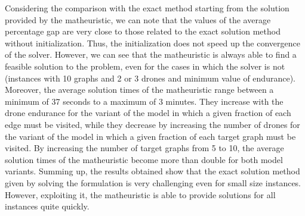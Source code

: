 \documentclass[10pt,a4paper]{elsarticle}
\newcommand{\EN}[1]{{\color{black}#1}}
\begin{document}
			Considering the comparison with the exact method starting from the solution provided by the matheuristic, we can note that the values of the average percentage gap are very close to \EN{those} related to the exact solution method without initialization. Thus, the initialization does not speed up the convergence of the solver. However, we can see that the matheuristic is always able to find a feasible solution \EN{to} the problem, even for the cases in which the solver is not (instances with 10 graphs and 2 or 3 drones and minimum value of endurance). 
			\noindent
			Moreover, the average solution times of the matheuristic range between a minimum of 37 seconds to a maximum of 3 minutes. They increase with the drone endurance for the variant of the model in which a given fraction of each edge must be visited, while they decrease by increasing the number of drones for the variant of the model in which a given fraction of each target graph must be visited. By increasing the number of target graphs from 5 to 10, the average solution times of the matheuristic become more than double for both model variants.
			Summing up, the results obtained show that the exact solution method given by solving the formulation is very challenging even for small size instances. However, exploiting it, the matheuristic is able to provide  solutions for all instances \EN{quite} quickly.
			
\end{document}
